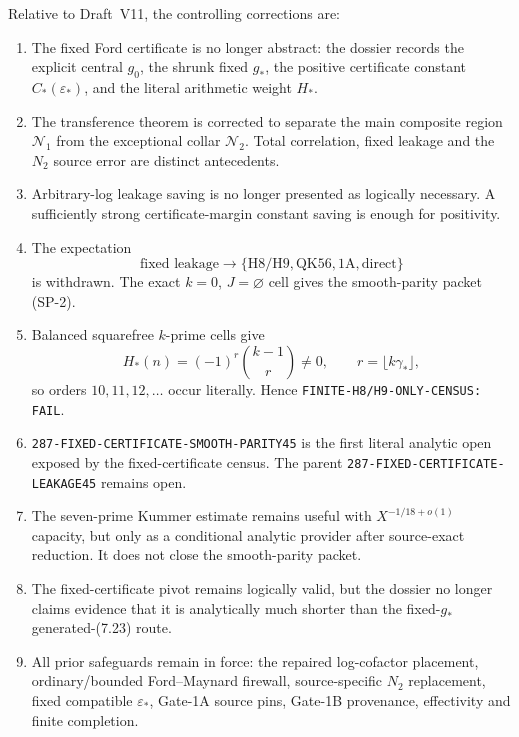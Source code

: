 \documentclass[11pt]{article}
\theoremstyle{definition}
\theoremstyle{remark}
\newcommand{\1}{\mathbf 1}
\begin{document}
Relative to Draft~V11, the controlling corrections are:
\begin{enumerate}
\item The fixed Ford certificate is no longer abstract: the dossier records the explicit central $g_0$, the
shrunk fixed $g_*$, the positive certificate constant $C_*(\varepsilon_*)$, and the literal arithmetic weight
$H_*$.
\item The transference theorem is corrected to separate the main composite region $\mathcal N_1$ from the
exceptional collar $\mathcal N_2$.  Total correlation, fixed leakage and the $N_2$ source error are distinct
antecedents.
\item Arbitrary-log leakage saving is no longer presented as logically necessary.  A sufficiently strong
certificate-margin constant saving is enough for positivity.
\item The expectation
\[
 \text{fixed leakage}\longrightarrow
 \{\mathrm{H8/H9},\mathrm{QK56},\mathrm{1A},\mathrm{direct}\}
\]
is withdrawn.  The exact $k=0$, $J=\varnothing$ cell gives the smooth-parity packet (SP-2).
\item Balanced squarefree $k$-prime cells give
\[
 H_*(n)=(-1)^r\binom{k-1}{r}\ne0,
 \qquad r=\lfloor k\gamma_*\rfloor,
\]
so orders $10,11,12,\ldots$ occur literally.  Hence
\texttt{FINITE-H8/H9-ONLY-CENSUS: FAIL}.
\item \texttt{287-FIXED-CERTIFICATE-SMOOTH-PARITY45} is the first literal analytic open exposed by the
fixed-certificate census.  The parent \texttt{287-FIXED-CERTIFICATE-LEAKAGE45} remains open.
\item The seven-prime Kummer estimate remains useful with $X^{-1/18+o(1)}$ capacity, but only as a conditional
analytic provider after source-exact reduction.  It does not close the smooth-parity packet.
\item The fixed-certificate pivot remains logically valid, but the dossier no longer claims evidence that it is
analytically much shorter than the fixed-$g_*$ generated-(7.23) route.
\item All prior safeguards remain in force: the repaired log-cofactor placement, ordinary/bounded
Ford--Maynard firewall, source-specific $N_2$ replacement, fixed compatible $\varepsilon_*$, Gate-1A source
pins, Gate-1B provenance, effectivity and finite completion.
\end{enumerate}
\end{document}
